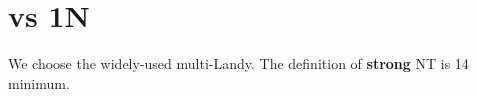 \section{vs 1N}

We choose the widely-used multi-Landy. The definition of \textbf{strong} NT is 14 minimum.


